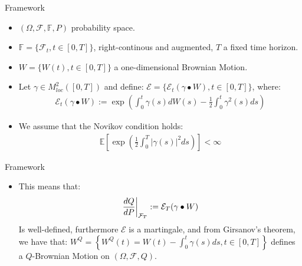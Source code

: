 \documentclass[UKenglish]{beamer}
\newcommand{\E}{\mathbb{E}}  %
\newcommand{\F}{\mathcal{F}} %
\begin{document}
\begin{frame}{Framework}
\begin{itemize}
    \item $(\Omega, \F, \mathbb{F}, P)$ probability space.  
    \item $\mathbb{F} = \{\F_{t}, t \in [0,T]\}$, right-continous and augmented, $T$ a fixed time horizon. 
    \item $W = \{W(t), t\in [0,T]\}$ a one-dimensional Brownian Motion. 
    \item Let $\gamma \in M^{2}_{loc}([0,T])$ and define:
    $\mathcal{E} = \{\mathcal{E}_{t}(\gamma \bullet W), t \in [0,T]\}$, where:
    \begin{align*}
     \mathcal{E}_{t}(\gamma \bullet W) := \exp\left(
     \int_{0}^{t}\gamma(s)dW(s) -\frac{1}{2}\int_{0}^{t}\gamma^{2}(s)ds
     \right)   
    \end{align*}
    \item We assume that the Novikov condition holds:
    \begin{align*}
     \E\left[
     \exp\left(
     \frac{1}{2}\int_{0}^{T}|\gamma(s)|^{2}ds
     \right)
     \right] < \infty   
    \end{align*}
\end{itemize}
\end{frame}


\begin{frame}{Framework}
\begin{itemize}
    \item This means that: 
    \begin{align*}
    \frac{dQ}{dP}\bigg{|}_{\F_{T}} := \mathcal{E}_{T}(\gamma \bullet W)   
    \end{align*}
    Is well-defined, furthermore $\mathcal{E}$ is a martingale, and from Girsanov's theorem, we have that: $W^{Q} = \left\{W^{Q}(t) = W(t) - \int_{0}^{t}\gamma(s)ds, t\in [0,T]\right\}$
    defines a $Q$-Brownian Motion on $(\Omega, \F, Q)$. 
\end{itemize} 
\end{frame}
\end{document}
